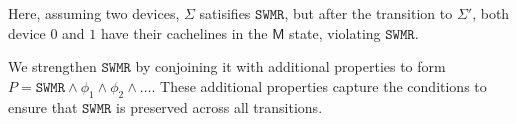 \documentclass[10pt,conference]{IEEEtran}
\newcommand{\StateSymbol}{\Sigma}
\newcommand\SWMR{\texttt{SWMR}}
\newcommand\Modified{\STATE{M}}
\newcommand\STATE[1]{\textsf{#1}}
\begin{document}
\medskip
Here, assuming two devices, $\StateSymbol{}$ satisifies $\SWMR$, but after the transition to $\StateSymbol{}'$, both device $0$ and $1$ have their cachelines in the $\Modified$ state, violating $\SWMR$. 

We strengthen $\SWMR$ by conjoining it with additional properties to form $P = \SWMR \land \phi_1 \land \phi_2 \land \ldots $. These additional properties capture the conditions to ensure that $\SWMR$  is preserved across all transitions.




\end{document}
